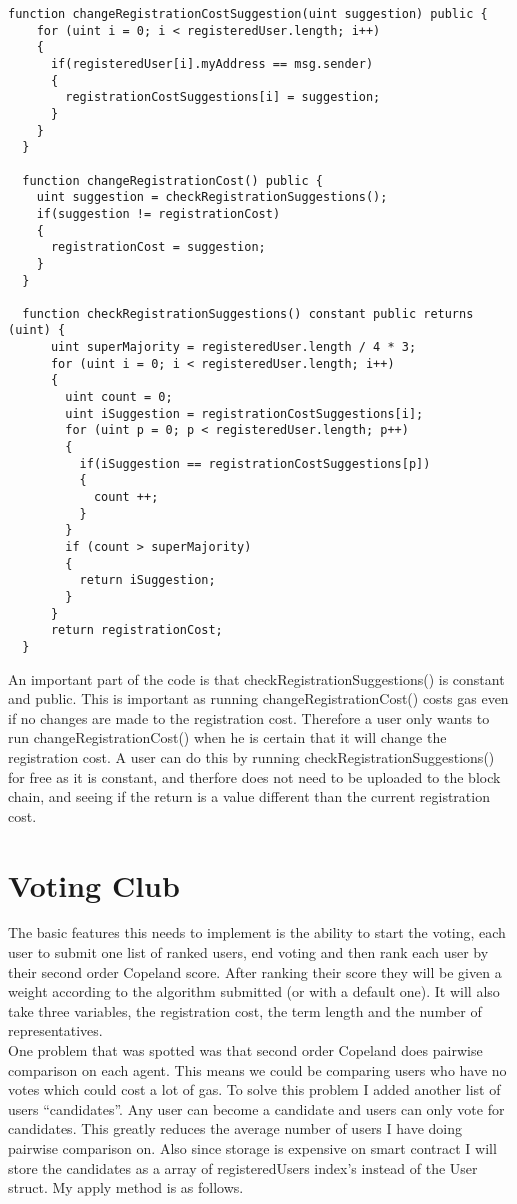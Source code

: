 \begin{lstlisting}
function changeRegistrationCostSuggestion(uint suggestion) public {
    for (uint i = 0; i < registeredUser.length; i++)
    {
      if(registeredUser[i].myAddress == msg.sender)
      {
        registrationCostSuggestions[i] = suggestion;
      }
    }
  }

  function changeRegistrationCost() public {
    uint suggestion = checkRegistrationSuggestions();
    if(suggestion != registrationCost)
    {
      registrationCost = suggestion;
    }
  }

  function checkRegistrationSuggestions() constant public returns (uint) {
      uint superMajority = registeredUser.length / 4 * 3;
      for (uint i = 0; i < registeredUser.length; i++)
      {
        uint count = 0;
        uint iSuggestion = registrationCostSuggestions[i];
        for (uint p = 0; p < registeredUser.length; p++)
        {
          if(iSuggestion == registrationCostSuggestions[p])
          {
            count ++;
          }
        }
        if (count > superMajority)
        {
          return iSuggestion;
        }
      }
      return registrationCost;
  }
\end{lstlisting}
An important part of the code is that checkRegistrationSuggestions() is constant and public. This is important as running changeRegistrationCost() costs gas even if no changes are made to the registration cost. Therefore a user only wants to run changeRegistrationCost() when he is certain that it will change the registration cost. A user can do this by running checkRegistrationSuggestions() for free as it is constant, and therfore does not need to be uploaded to the block chain, and seeing if the return is a value different than the current registration cost.
\section{Voting Club}
The basic features this needs to implement is the ability to start the voting, each user to submit one list of ranked users, end voting and then rank each user by their second order Copeland score. After ranking their score they will be given a weight according to the algorithm submitted (or with a default one). It will also take three variables, the registration cost, the term length and the number of representatives. \\
One problem that was spotted was that second order Copeland does pairwise comparison on each agent. This means we could be comparing users who have no votes which could cost a lot of gas. To solve this problem I added another list of users “candidates”. Any user can become a candidate and users can only vote for candidates. This greatly reduces the average number of users I have doing pairwise comparison on. Also since storage is expensive on smart contract I will store the candidates as a array of registeredUsers index’s instead of the User struct. My apply method is as follows.


